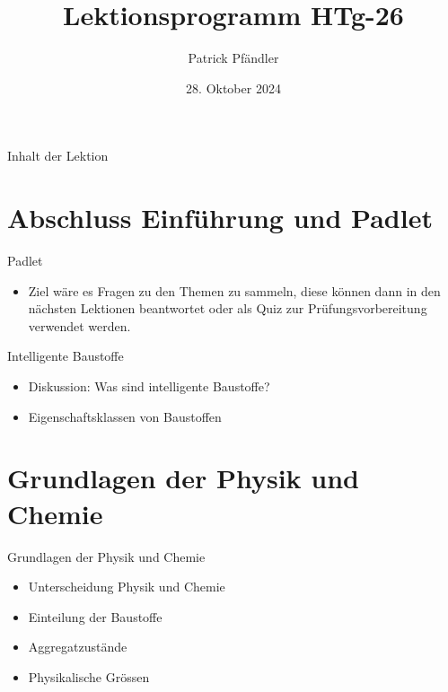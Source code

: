 



\title{\textbf{Lektionsprogramm HTg-26}}
\author{Patrick Pfändler}
\date{28. Oktober 2024}




\frame{\titlepage}

\begin{frame}{Inhalt der Lektion}
    \tableofcontents
\end{frame}


\section{Abschluss Einführung und Padlet}

\begin{frame}{Padlet}
\begin{itemize}
	\item Ziel wäre es Fragen zu den Themen zu sammeln, diese können dann in den nächsten Lektionen beantwortet oder als Quiz zur Prüfungsvorbereitung verwendet werden.
\end{itemize}
\end{frame}


\begin{frame}{Intelligente Baustoffe}
	\begin{itemize}
		\item Diskussion: Was sind intelligente Baustoffe?
		\item Eigenschaftsklassen von Baustoffen
	\end{itemize}
	\end{frame}



%
\section{Grundlagen der Physik und Chemie}
\begin{frame}{Grundlagen der Physik und Chemie}
\begin{itemize}
	\item Unterscheidung Physik und Chemie
	\item Einteilung der Baustoffe
	\item Aggregatzustände
	\item Physikalische Grössen
\end{itemize}
\end{frame}




